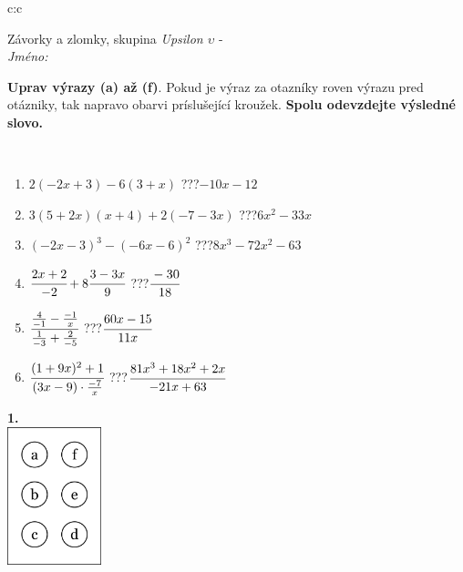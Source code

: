 \documentclass[10pt]{report}
\begin{document}
\begin{tabular}{c:c}
\begin{minipage}[c][104.5mm][t]{0.5\linewidth}
\begin{center}
\vspace{7mm}
{\huge Závorky a zlomky, skupina \textit{Upsilon $\upsilon$} -}\\[5mm]
\textit{Jméno:}\phantom{xxxxxxxxxxxxxxxxxxxxxxxxxxxxxxxxxxxxxxxxxxxxxxxxxxxxxxxxxxxxxxxxx}\\[5mm]
\begin{minipage}{0.95\linewidth}
\begin{center}
\textbf{Uprav výrazy (a) až (f)}. Pokud je výraz za otazníky roven výrazu pred otázniky, tak napravo obarvi príslušející kroužek. \textbf{Spolu odevzdejte výsledné slovo.}
\end{center}
\end{minipage}
\\[1mm]
\begin{minipage}{0.79\linewidth}
\begin{center}
\begin{varwidth}{\linewidth}
\begin{enumerate}
\normalsize
\item $2(-2x+3)-6(3+x)$\quad \dotfill\; ???\;\dotfill \quad $-10x-12$
\item $3(5+2x)(x+4)+2(-7-3x)$\quad \dotfill\; ???\;\dotfill \quad $6x^2-33x$
\item $(-2x-3)^3-(-6x-6)^2$\quad \dotfill\; ???\;\dotfill \quad $8x^3-72x^2-63$
\item $\cfrac{2x+2}{-2}+8\cfrac{3-3x}{9}$\quad \dotfill\; ???\;\dotfill \quad $\cfrac{-30}{18}$
\item $\cfrac{\frac{4}{-1}-\frac{-1}{x}}{\frac{1}{-3}+\frac{2}{-5}}$\quad \dotfill\; ???\;\dotfill \quad $\cfrac{60x-15}{11x}$
\item $\cfrac{(1+9x)^2+1}{(3x-9)\cdot\frac{-7}{x}}$\quad \dotfill\; ???\;\dotfill \quad $\cfrac{81x^3+18x^2+2x}{-21x+63}$
\end{enumerate}
\end{varwidth}
\end{center}
\end{minipage}
\begin{minipage}{0.20\linewidth}
\begin{center}
{\Huge\bfseries 1.} \\[2mm]
\includegraphics[height=40mm]{../images/braille.png}

\end{center}
\end{minipage}
\end{center}
\end{minipage}
\end{tabular}
\end{document}
